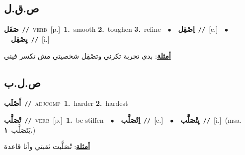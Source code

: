 \documentclass[10pt,a4paper,twoside]{article} %
\begin{document}
\begin{multicols}{2}
\vspace{-3mm}
\subsection*{\color{blue}\foreignlanguage{arabic}{ص.ق.ل}\color{blue}{}} 

{\setlength\topsep{0pt}\textbf{\foreignlanguage{arabic}{صَقَل}}\ {\color{gray}\texttt{//}\color{black}}\ \textsc{verb}\ [p.]\ \textbf{1.}~smooth  \textbf{2.}~toughen  \textbf{3.}~refine\ \ $\bullet$\ \ \setlength\topsep{0pt}\textbf{\foreignlanguage{arabic}{اِصْقِل}}\ {\color{gray}\texttt{//}\color{black}}\ [c.]\ \ $\bullet$\ \ \setlength\topsep{0pt}\textbf{\foreignlanguage{arabic}{يِصْقِل}}\ {\color{gray}\texttt{//}\color{black}}\ [i.]\  \begin{flushright}\color{gray}\foreignlanguage{arabic}{\textbf{\underline{\foreignlanguage{arabic}{أمثلة}}}: بدي تجربة تكرني وتصْقِل شخصيتي مش تكسر فيني}\end{flushright}\color{black}} \vspace{2mm}

\vspace{-3mm}
\subsection*{\color{blue}\foreignlanguage{arabic}{ص.ل.ب}\color{blue}{}} 

{\setlength\topsep{0pt}\textbf{\foreignlanguage{arabic}{أَصْلَب}}\ {\color{gray}\texttt{//}\color{black}}\ \textsc{adj\textunderscore comp}\ \textbf{1.}~harder  \textbf{2.}~hardest\ } \vspace{2mm}

{\setlength\topsep{0pt}\textbf{\foreignlanguage{arabic}{تْصَلَّب}}\ {\color{gray}\texttt{//}\color{black}}\ \textsc{verb}\ [p.]\ \textbf{1.}~be stiffen\ \ $\bullet$\ \ \setlength\topsep{0pt}\textbf{\foreignlanguage{arabic}{اِتْصَلَّب}}\ {\color{gray}\texttt{//}\color{black}}\ [c.]\ \ $\bullet$\ \ \setlength\topsep{0pt}\textbf{\foreignlanguage{arabic}{يِتْصَلَّب}}\ {\color{gray}\texttt{//}\color{black}}\ [i.]\ \color{gray}(msa. \foreignlanguage{arabic}{يَتَصَلَّب}~\foreignlanguage{arabic}{\textbf{١.}})\color{black}\  \begin{flushright}\color{gray}\foreignlanguage{arabic}{\textbf{\underline{\foreignlanguage{arabic}{أمثلة}}}: تْصَلَّبت ثقبتي وأنا قاعدة}\end{flushright}\color{black}} \vspace{2mm}


\end{multicols}
\end{document}
